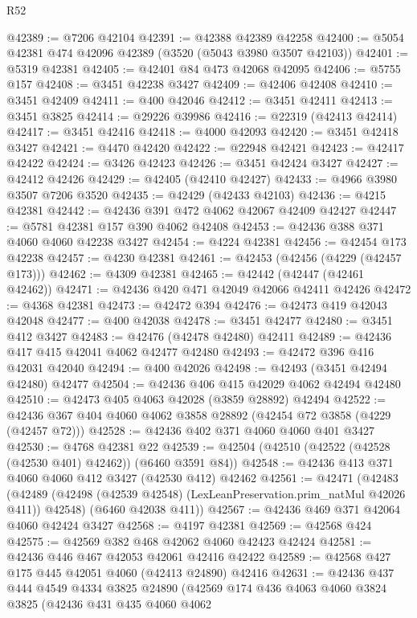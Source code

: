 \begin{lexlean}{R52}
\begin{coremodule}
@42389 := @7206 @42104
@42391 := @42388 @42389 @42258
@42400 := @5054 @42381 @474 @42096 @42389 (@3520 (@5043 @3980 @3507 @42103))
@42401 := @5319 @42381
@42405 := @42401 @84 @473 @42068 @42095
@42406 := @5755 @157
@42408 := @3451 @42238 @3427
@42409 := @42406 @42408
@42410 := @3451 @42409
@42411 := @400 @42046
@42412 := @3451 @42411
@42413 := @3451 @3825
@42414 := @29226 @39986
@42416 := @22319 (@42413 @42414)
@42417 := @3451 @42416
@42418 := @4000 @42093
@42420 := @3451 @42418 @3427
@42421 := @4470 @42420
@42422 := @22948 @42421
@42423 := @42417 @42422
@42424 := @3426 @42423
@42426 := @3451 @42424 @3427
@42427 := @42412 @42426
@42429 := @42405 (@42410 @42427)
@42433 := @4966 @3980 @3507 @7206 @3520
@42435 := @42429 (@42433 @42103)
@42436 := @4215 @42381
@42442 := @42436 @391 @472 @4062 @42067 @42409 @42427
@42447 := @5781 @42381 @157 @390 @4062 @42408
@42453 := @42436 @388 @371 @4060 @4060 @42238 @3427
@42454 := @4224 @42381
@42456 := @42454 @173 @42238
@42457 := @4230 @42381
@42461 := @42453 (@42456 (@4229 (@42457 @173)))
@42462 := @4309 @42381
@42465 := @42442 (@42447 (@42461 @42462))
@42471 := @42436 @420 @471 @42049 @42066 @42411 @42426
@42472 := @4368 @42381
@42473 := @42472 @394
@42476 := @42473 @419 @42043 @42048
@42477 := @400 @42038
@42478 := @3451 @42477
@42480 := @3451 @412 @3427
@42483 := @42476 (@42478 @42480) @42411
@42489 := @42436 @417 @415 @42041 @4062 @42477 @42480
@42493 := @42472 @396 @416 @42031 @42040
@42494 := @400 @42026
@42498 := @42493 (@3451 @42494 @42480) @42477
@42504 := @42436 @406 @415 @42029 @4062 @42494 @42480
@42510 := @42473 @405 @4063 @42028 (@3859 @28892) @42494
@42522 := @42436 @367 @404 @4060 @4062 @3858 @28892 (@42454 @72 @3858 (@4229 (@42457 @72)))
@42528 := @42436 @402 @371 @4060 @4060 @401 @3427
@42530 := @4768 @42381 @22
@42539 := @42504 (@42510 (@42522 (@42528 (@42530 @401) @42462)) (@6460 @3591 @84))
@42548 := @42436 @413 @371 @4060 @4060 @412 @3427 (@42530 @412) @42462
@42561 := @42471
    (@42483
      (@42489 (@42498 (@42539 @42548) (LexLeanPreservation.prim_natMul @42026 @411)) @42548)
      (@6460 @42038 @411))
@42567 := @42436 @469 @371 @42064 @4060 @42424 @3427
@42568 := @4197 @42381
@42569 := @42568 @424
@42575 := @42569 @382 @468 @42062 @4060 @42423 @42424
@42581 := @42436 @446 @467 @42053 @42061 @42416 @42422
@42589 := @42568 @427 @175 @445 @42051 @4060 (@42413 @24890) @42416
@42631 := @42436
    @437
    @444
    @4549
    @4334
    @3825
    @24890
    (@42569
      @174
      @436
      @4063
      @4060
      @3824
      @3825
      (@42436
        @431
        @435
        @4060
        @4062

\end{coremodule}
\end{lexlean}
